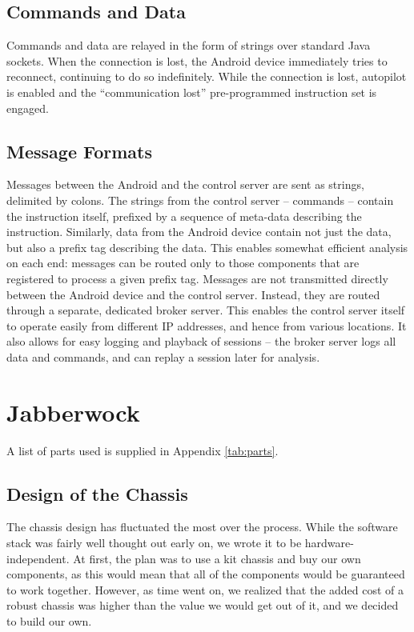 \subsection{Commands and Data}
Commands and data are relayed in the form of strings over standard
Java sockets.‭ ‬When the connection is lost,‭ ‬the Android device
immediately tries to reconnect,‭ ‬continuing to do so indefinitely.‭
‬While the connection is lost, autopilot is enabled and the‭
``‬communication lost‭'' pre-programmed instruction set is engaged.

\subsection{Message Formats}
\label{sec:msgs}
‏Messages between the Android and the control server are sent as
strings,‭ ‬delimited by colons.‭ ‬The strings from the control server --
commands -- contain the instruction itself,‭ ‬prefixed by a sequence of
meta-data describing the instruction.‭ ‬Similarly,‭ ‬data from the Android
device contain not just the data,‭ ‬but also a prefix tag describing the
data.‭ ‬This enables somewhat efficient analysis on each end:‭ ‬messages can
be routed only to those components that are registered to process a
given prefix tag.  Messages are not transmitted directly between the
Android device and the control server.‭ ‬Instead,‭ ‬they are routed through
a separate,‭ ‬dedicated broker server.‭ ‬This enables the control server
itself to operate easily from different IP addresses,‭ ‬and hence from
various locations. It also allows for easy logging and playback of
sessions -- the broker server logs all data and commands, and can replay
a session later for analysis.

\section{Jabberwock}
A list of parts used is supplied in Appendix \ref{tab:parts}.

\subsection{Design of the Chassis}
The chassis design has fluctuated the most over the process. While the
software stack was fairly well thought out early on, we wrote it to be
hardware-independent. At first, the plan was to use a kit chassis and
buy our own components, as this would mean that all of the components
would be guaranteed to work together. However, as time went on, we
realized that the added cost of a robust chassis was higher than the
value we would get out of it, and we decided to build our own.

